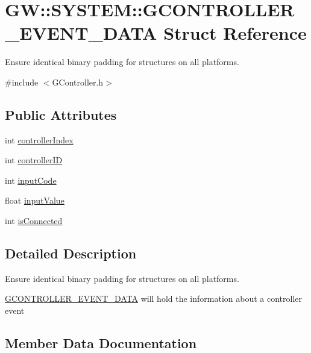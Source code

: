 \hypertarget{structGW_1_1SYSTEM_1_1GCONTROLLER__EVENT__DATA}{}\section{GW\+::S\+Y\+S\+T\+EM\+::G\+C\+O\+N\+T\+R\+O\+L\+L\+E\+R\+\_\+\+E\+V\+E\+N\+T\+\_\+\+D\+A\+TA Struct Reference}
\label{structGW_1_1SYSTEM_1_1GCONTROLLER__EVENT__DATA}


Ensure identical binary padding for structures on all platforms.  




{\ttfamily \#include $<$G\+Controller.\+h$>$}

\subsection*{Public Attributes}
\begin{DoxyCompactItemize}
\item 
int \mbox{\hyperlink{structGW_1_1SYSTEM_1_1GCONTROLLER__EVENT__DATA_afe34a20f1171d42f67fa364174f49864}{controller\+Index}}
\item 
int \mbox{\hyperlink{structGW_1_1SYSTEM_1_1GCONTROLLER__EVENT__DATA_a436b1993c1b69cf51e3baa122a2927f2}{controller\+ID}}
\item 
int \mbox{\hyperlink{structGW_1_1SYSTEM_1_1GCONTROLLER__EVENT__DATA_a0b8f01eefbd8fdb0b11da6bef3ba6e5d}{input\+Code}}
\item 
float \mbox{\hyperlink{structGW_1_1SYSTEM_1_1GCONTROLLER__EVENT__DATA_a919e5866e08ed8a84c4157c272045217}{input\+Value}}
\item 
int \mbox{\hyperlink{structGW_1_1SYSTEM_1_1GCONTROLLER__EVENT__DATA_a75772bfa2f01fe8408ffec36be9f0c70}{is\+Connected}}
\end{DoxyCompactItemize}


\subsection{Detailed Description}
Ensure identical binary padding for structures on all platforms. 

\mbox{\hyperlink{structGW_1_1SYSTEM_1_1GCONTROLLER__EVENT__DATA}{G\+C\+O\+N\+T\+R\+O\+L\+L\+E\+R\+\_\+\+E\+V\+E\+N\+T\+\_\+\+D\+A\+TA}} will hold the information about a controller event 

\subsection{Member Data Documentation}
\mbox{\label{structGW_1_1SYSTEM_1_1GCONTROLLER__EVENT__DATA_a436b1993c1b69cf51e3baa122a2927f2}} 
